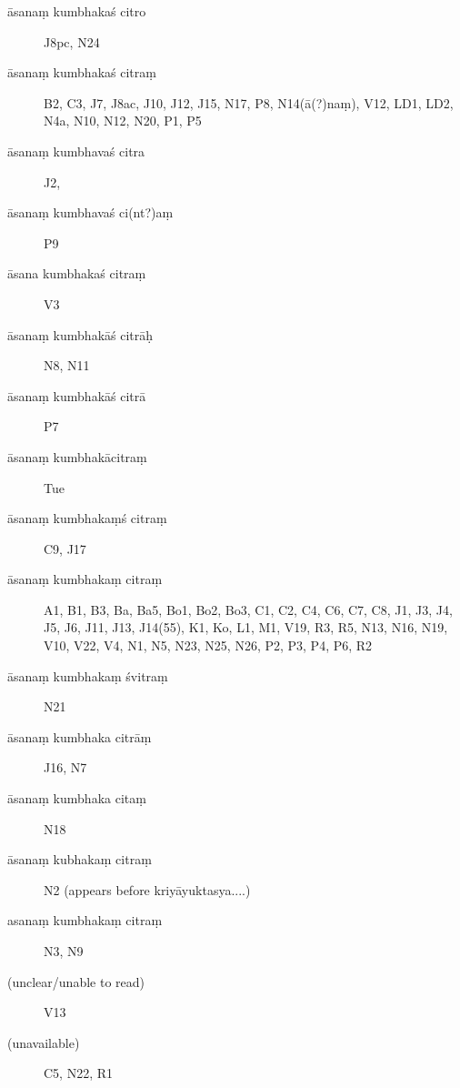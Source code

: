 \begin{ekdosis}
\begin{marma}[hp01_055]
\begin{marma}[hp01_056]
 \begin{description}
 \item[āsanaṃ kumbhakaś citro] J8pc, N24
 \item[āsanaṃ kumbhakaś citraṃ] B2, C3, J7, J8ac, J10, J12, J15, N17, P8, N14(ā(?)naṃ), V12, LD1, LD2, N4a, N10, N12, N20, P1, P5
 \item[āsanaṃ kumbhavaś citra] J2,
\item[āsanaṃ kumbhavaś ci(nt?)aṃ] P9
 \item[āsana kumbhakaś citraṃ] V3
\item[āsanaṃ kumbhakāś citrāḥ]  N8, N11
\item[āsanaṃ kumbhakāś citrā]   P7
\item[āsanaṃ kumbhakācitraṃ]   Tue
 \item[āsanaṃ kumbhakaṃś citraṃ] C9, J17
 \item[āsanaṃ kumbhakaṃ citraṃ] A1, B1, B3, Ba, Ba5, Bo1, Bo2, Bo3, C1, C2, C4, C6, C7, C8, J1, J3, J4, J5, J6, J11, J13, J14(55), K1, Ko, L1, M1, V19, R3, R5, N13, N16, N19, V10, V22, V4, N1, N5, N23, N25, N26, P2, P3, P4, P6, R2
\item[āsanaṃ kumbhakaṃ śvitraṃ]   N21   
 \item[āsanaṃ kumbhaka citrāṃ] J16, N7
 \item[āsanaṃ kumbhaka citaṃ] N18
\item[āsanaṃ kubhakaṃ citraṃ] N2 (appears before kriyāyuktasya....)
\item[asanaṃ kumbhakaṃ citraṃ] N3, N9
 \item[(unclear/unable to read)] V13
\item[(unavailable)]        C5, N22, R1
        \end{description}


\end{marma}
\end{marma}
\end{ekdosis}
